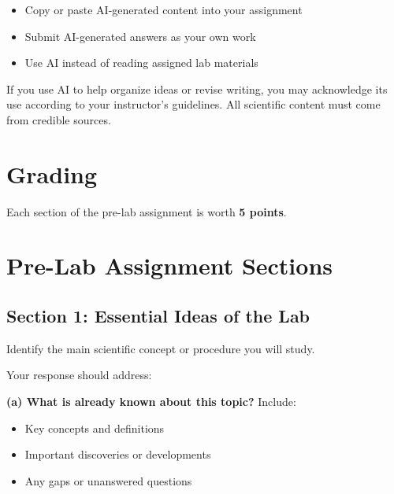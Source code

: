 \documentclass[
  letterpaper,
  DIV=11,
  numbers=noendperiod]{scrreprt}
\begin{document}
\begin{itemize}
\item
  Copy or paste AI-generated content into your assignment
\item
  Submit AI-generated answers as your own work
\item
  Use AI instead of reading assigned lab materials
\end{itemize}

If you use AI to help organize ideas or revise writing, you may
acknowledge its use according to your instructor's guidelines. All
scientific content must come from credible sources.

\section*{\texorpdfstring{\textbf{Grading}}{Grading}}\label{grading}


Each section of the pre-lab assignment is worth \textbf{5 points}.

\section*{\texorpdfstring{\textbf{Pre-Lab Assignment
Sections}}{Pre-Lab Assignment Sections}}\label{pre-lab-assignment-sections}


\subsection*{\texorpdfstring{\textbf{Section 1: Essential Ideas of the
Lab}}{Section 1: Essential Ideas of the Lab}}\label{section-1-essential-ideas-of-the-lab}

Identify the main scientific concept or procedure you will study.

Your response should address:

\textbf{(a) What is already known about this topic?} Include:

\begin{itemize}
\item
  Key concepts and definitions
\item
  Important discoveries or developments
\item
  Any gaps or unanswered questions
\end{itemize}
\end{document}
